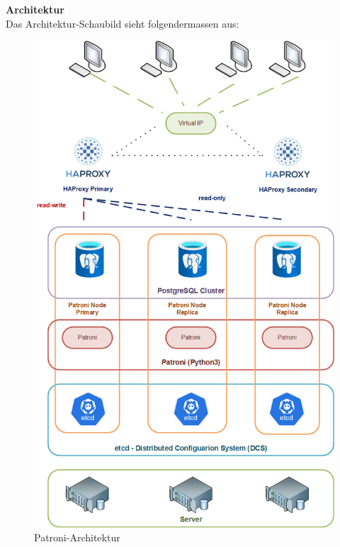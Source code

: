 \begin{flushleft}
    \textbf{Architektur}\\
    Das Architektur-Schaubild sieht folgendermassen aus:
    \begin{figure}[H]
        \centering
        \includegraphics[width=1\linewidth]{source/implementation/evaluation/postgresql_ha_solutions/patroni_architecture}
        \caption{Patroni-Architektur}
        \label{fig:patroni-architecture}
    \end{figure}
\end{flushleft}
